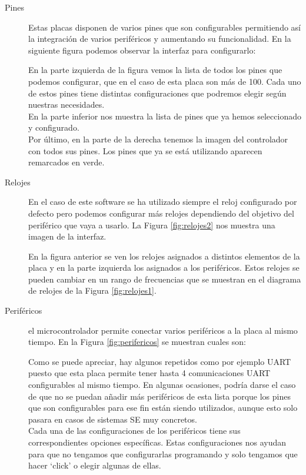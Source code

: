 \begin{description}
\item[Pines] Estas placas disponen de varios pines que son configurables permitiendo así la integración de varios periféricos y aumentando su funcionalidad. En la siguiente figura podemos observar la interfaz para configurarlo:


En la parte izquierda de la figura vemos la lista de todos los pines que podemos configurar, que en el caso de esta placa son más de 100. Cada uno de estos pines tiene distintas configuraciones que podremos elegir según nuestras necesidades. \\ 
En la parte inferior nos muestra la lista de pines que ya hemos seleccionado y configurado. \\
Por último, en la parte de la derecha tenemos la imagen del controlador con todos sus pines. Los pines que ya se está utilizando aparecen remarcados en verde.
\item[Relojes] En el caso de este software se ha utilizado siempre el reloj configurado por defecto pero podemos configurar más relojes dependiendo del objetivo del periférico que vaya a usarlo. La Figura \ref{fig:relojes2} nos muestra una imagen de la interfaz.

 \label{relojes2}

En la figura anterior se ven los relojes asignados a distintos elementos de la placa y en la parte izquierda los asignados a los periféricos. Estos relojes se pueden cambiar en un rango de frecuencias que se muestran en el diagrama de relojes de la Figura \ref{fig:relojes1}.
 \label{relojes1}

\item[Periféricos] el microcontrolador permite conectar varios periféricos a la placa al mismo tiempo. En la Figura \ref{fig:perifericos} se muestran cuales son:

 \label{perifericos}

Como se puede apreciar, hay algunos repetidos como por ejemplo UART puesto que esta placa permite tener hasta 4 comunicaciones UART configurables al mismo tiempo. En algunas ocasiones, podría darse el caso de que no se puedan añadir más periféricos de esta lista porque los pines que son configurables para ese fin están siendo utilizados, aunque esto solo pasara en casos de sistemas SE muy concretos. \\
Cada una de las configuraciones de los periféricos tiene sus correspondientes opciones específicas. Estas configuraciones nos ayudan para que no tengamos que configurarlas programando y solo tengamos que hacer `click’ o elegir algunas de ellas. 
\end{description}

